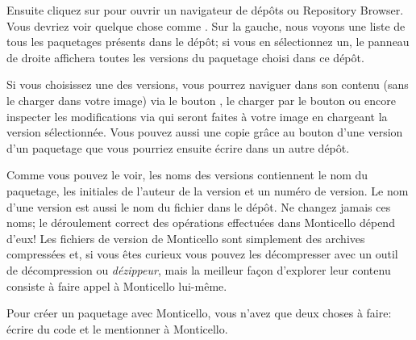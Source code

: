 \documentclass[a4paper,10pt,twoside]{book}
\begin{document}
Ensuite cliquez sur  pour ouvrir un navigateur de dépôts ou
Repository Browser. Vous devriez voir quelque chose comme
 .  
Sur la gauche, nous voyons une liste de tous les paquetages présents dans le
dépôt; si vous en sélectionnez un, le panneau de droite affichera
toutes les versions du paquetage choisi dans ce dépôt.

Si vous choisissez une des versions, vous pourrez naviguer dans son contenu (sans le charger dans votre image) via le bouton , le charger
par le bouton  ou encore inspecter les modifications
via  qui seront faites à votre image en chargeant la version
sélectionnée. Vous pouvez aussi une copie grâce au bouton 
d'une version d'un paquetage que vous pourriez ensuite écrire dans un
autre dépôt.

Comme vous pouvez le voir, les noms des versions contiennent le nom du paquetage, les initiales de l'auteur de la version et un numéro de version.
Le nom d'une version est aussi le nom du fichier dans le dépôt. Ne
changez jamais ces noms; le déroulement correct des opérations
effectuées dans Monticello dépend d'eux!
Les fichiers de version de Monticello sont simplement des archives compressées
 et, si vous êtes curieux vous pouvez les décompresser avec un outil 
de décompression ou \emph{dézippeur}, mais la meilleur façon 
d'explorer leur contenu consiste à faire appel à Monticello lui-même.

Pour créer un paquetage avec Monticello, vous n'avez que deux choses à faire:
écrire du code et le mentionner à Monticello.

\end{document}
